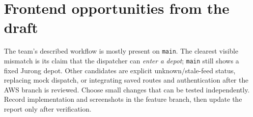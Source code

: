 \documentclass[11pt,a4paper]{article}
\begin{document}
\section{Frontend opportunities from the draft}
The team's described workflow is mostly present on \texttt{main}. The clearest visible mismatch is its claim that the dispatcher can \emph{enter a depot}; \texttt{main} still shows a fixed Jurong depot. Other candidates are explicit unknown/stale-feed status, replacing mock dispatch, or integrating saved routes and authentication after the AWS branch is reviewed. Choose small changes that can be tested independently. Record implementation and screenshots in the feature branch, then update the report only after verification.
\end{document}
